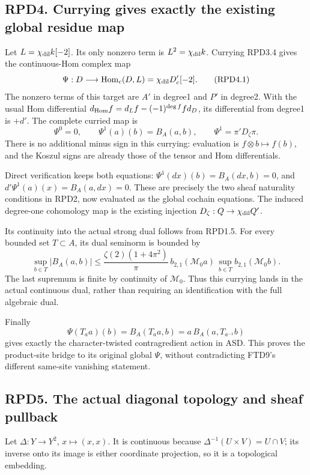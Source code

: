 \subsection{RPD4. Currying gives exactly the existing global residue
map}\label{rpd4.-currying-gives-exactly-the-existing-global-residue-map}

Let \(L=\chi_{\rm dil}k[-2]\). Its only nonzero term is
\(L^2=\chi_{\rm dil}k\). Currying RPD3.4 gives the continuous-Hom
complex map \[
\Psi:D\longrightarrow\operatorname{Hom}_c(D,L)
=\chi_{\rm dil}D'_c[-2].
\tag{RPD4.1}
\] The nonzero terms of this target are \(A'\) in degree1 and \(P'\) in
degree2. With the usual Hom differential
\(d_{\rm Hom}f=d_Lf-(-1)^{\deg f}f d_D\), its differential from degree1
is \(+d'\). The complete curried map is \[
\boxed{\Psi^0=0,\qquad
\Psi^1(a)(b)=B_A(a,b),\qquad
\Psi^1=\pi'D_\zeta\pi.}
\tag{RPD4.2}
\] There is no additional minus sign in this currying: evaluation is
\(f\otimes b\mapsto f(b)\), and the Koszul signs are already those of
the tensor and Hom differentials.

Direct verification keeps both equations: \(\Psi^1(dx)(b)=B_A(dx,b)=0\),
and \(d'\Psi^1(a)(x)=B_A(a,dx)=0\). These are precisely the two sheaf
naturality conditions in RPD2, now evaluated as the global cochain
equations. The induced degree-one cohomology map is the existing
injection \(D_\zeta:Q\to\chi_{\rm dil}Q'\).

Its continuity into the actual strong dual follows from RPD1.5. For
every bounded set \(T\subset A\), its dual seminorm is bounded by \[
\sup_{b\in T}|B_A(a,b)|
\le\frac{\zeta(2)(1+4\pi^2)}{\pi}
\,b_{2,1}(\mathcal M_0a)\,
\sup_{b\in T}b_{2,1}(\mathcal M_0b).
\] The last supremum is finite by continuity of \(\mathcal M_0\). Thus
this currying lands in the actual continuous dual, rather than requiring
an identification with the full algebraic dual.

Finally \[
\Psi(T_aa)(b)=B_A(T_aa,b)
=a\,B_A(a,T_{a^{-1}}b)
\] gives exactly the character-twisted contragredient action in ASD.
This proves the product-site bridge to its original global \(\Psi\),
without contradicting FTD9's different same-site vanishing statement.

\subsection{RPD5. The actual diagonal topology and sheaf
pullback}\label{rpd5.-the-actual-diagonal-topology-and-sheaf-pullback}

Let \(\Delta:Y\to Y^2\), \(x\mapsto(x,x)\). It is continuous because
\(\Delta^{-1}(U\times V)=U\cap V\); its inverse onto its image is either
coordinate projection, so it is a topological embedding.

